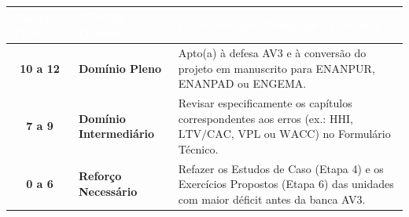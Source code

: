 \begin{tcolorbox}[colback=bgTeal, colframe=etTeal, arc=3pt, boxrule=0.8pt, title={\bfseries Painel de Diagnóstico Final, Prontidão para a AV3 e Publicação}, coltitle=white, colbacktitle=etTeal]
\renewcommand{\arraystretch}{1.2}
\footnotesize
\begin{tabularx}{\textwidth}{@{}c >{\raggedright\arraybackslash}X >{\raggedright\arraybackslash}X@{}}
  \toprule
  \rowcolor{etIndigo}
  \textcolor{white}{\bfseries Acertos (Parte I)} & \textcolor{white}{\bfseries Nível de Domínio} & \textcolor{white}{\bfseries Recomendação Pedagógica Imediata} \\
  \midrule
  \textbf{10 a 12} & \textbf{Domínio Pleno} & Apto(a) à defesa AV3 e à conversão do projeto em manuscrito para ENANPUR, ENANPAD ou ENGEMA. \\
  \rowcolor{bgGray}
  \textbf{7 a 9} & \textbf{Domínio Intermediário} & Revisar especificamente os capítulos correspondentes aos erros (ex.: $\text{HHI}$, $\text{LTV/CAC}$, $\text{VPL}$ ou $\text{WACC}$) no Formulário Técnico. \\
  \textbf{0 a 6} & \textbf{Reforço Necessário} & Refazer os Estudos de Caso (Etapa 4) e os Exercícios Propostos (Etapa 6) das unidades com maior déficit antes da banca AV3. \\
  \bottomrule
\end{tabularx}
\end{tcolorbox}
